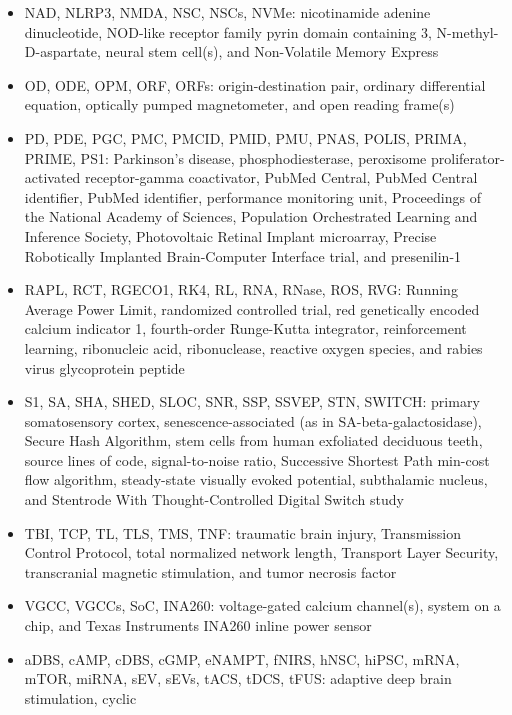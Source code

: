 \documentclass[10pt,letterpaper]{article}
\begin{document}
\begin{itemize}
  embryonic fibroblast(s), magnetoencephalography, machine learning,
  magnetic resonance, mesenchymal stem cell(s), minimum spanning tree,
  microvesicle(s), and Mixture of Experts
\item
  NAD, NLRP3, NMDA, NSC, NSCs, NVMe: nicotinamide adenine dinucleotide,
  NOD-like receptor family pyrin domain containing 3,
  N-methyl-D-aspartate, neural stem cell(s), and Non-Volatile Memory
  Express
\item
  OD, ODE, OPM, ORF, ORFs: origin-destination pair, ordinary
  differential equation, optically pumped magnetometer, and open reading
  frame(s)
\item
  PD, PDE, PGC, PMC, PMCID, PMID, PMU, PNAS, POLIS, PRIMA, PRIME, PS1:
  Parkinson's disease, phosphodiesterase, peroxisome
  proliferator-activated receptor-gamma coactivator, PubMed Central,
  PubMed Central identifier, PubMed identifier, performance monitoring
  unit, Proceedings of the National Academy of Sciences, Population
  Orchestrated Learning and Inference Society, Photovoltaic Retinal
  Implant microarray, Precise Robotically Implanted Brain-Computer
  Interface trial, and presenilin-1
\item
  RAPL, RCT, RGECO1, RK4, RL, RNA, RNase, ROS, RVG: Running Average
  Power Limit, randomized controlled trial, red genetically encoded
  calcium indicator 1, fourth-order Runge-Kutta integrator,
  reinforcement learning, ribonucleic acid, ribonuclease, reactive
  oxygen species, and rabies virus glycoprotein peptide
\item
  S1, SA, SHA, SHED, SLOC, SNR, SSP, SSVEP, STN, SWITCH: primary
  somatosensory cortex, senescence-associated (as in
  SA-beta-galactosidase), Secure Hash Algorithm, stem cells from human
  exfoliated deciduous teeth, source lines of code, signal-to-noise
  ratio, Successive Shortest Path min-cost flow algorithm, steady-state
  visually evoked potential, subthalamic nucleus, and Stentrode With
  Thought-Controlled Digital Switch study
\item
  TBI, TCP, TL, TLS, TMS, TNF: traumatic brain injury, Transmission
  Control Protocol, total normalized network length, Transport Layer
  Security, transcranial magnetic stimulation, and tumor necrosis factor
\item
  VGCC, VGCCs, SoC, INA260: voltage-gated calcium channel(s), system on
  a chip, and Texas Instruments INA260 inline power sensor
\item
  aDBS, cAMP, cDBS, cGMP, eNAMPT, fNIRS, hNSC, hiPSC, mRNA, mTOR, miRNA,
  sEV, sEVs, tACS, tDCS, tFUS: adaptive deep brain stimulation, cyclic

\end{itemize}
\end{document}
